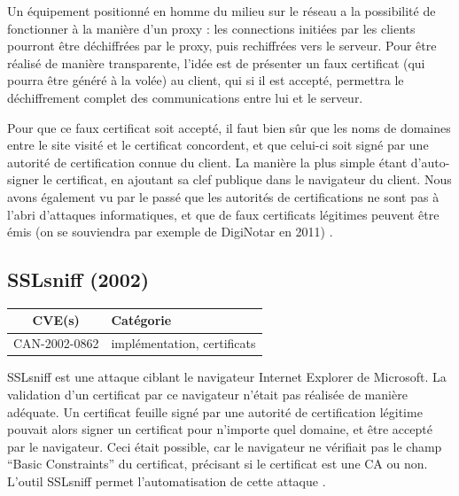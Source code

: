 Un équipement positionné en homme du milieu sur le réseau a la possibilité de fonctionner à la manière d'un proxy : les connections initiées par les clients pourront être déchiffrées par le proxy, puis rechiffrées vers le serveur. Pour être réalisé de manière transparente, l'idée est de présenter un faux certificat (qui pourra être généré à la volée) au client, qui si il est accepté, permettra le déchiffrement complet des communications entre lui et le serveur.

Pour que ce faux certificat soit accepté, il faut bien sûr que les noms de domaines entre le site visité et le certificat concordent, et que celui-ci soit signé par une autorité de certification connue du client. La manière la plus simple étant d'auto-signer le certificat, en ajoutant sa clef publique dans le navigateur du client. Nous avons également vu par le passé que les autorités de certifications ne sont pas à l'abri d'attaques informatiques, et que de faux certificats légitimes peuvent être émis (on se souviendra par exemple de DigiNotar en 2011) \cite{https-interception}.




\subsection{SSLsniff (2002)}

\begin{tabularx}{0.96\textwidth}{|c|X|}
  \hline
  \textbf{CVE(s)} & \textbf{Catégorie} \\
  \hline
  CAN-2002-0862 & implémentation, certificats \\
  \hline
\end{tabularx}

\vspace{1em}

SSLsniff est une attaque ciblant le navigateur Internet Explorer de Microsoft. La validation d'un certificat par ce navigateur n'était pas réalisée de manière adéquate. Un certificat feuille signé par une autorité de certification légitime pouvait alors signer un certificat pour n'importe quel domaine, et être accepté par le navigateur. Ceci était possible, car le navigateur ne vérifiait pas le champ ``Basic Constraints'' du certificat, précisant si le certificat est une CA ou non. L'outil SSLsniff permet l'automatisation de cette attaque \cite{sslsniff-website}.


